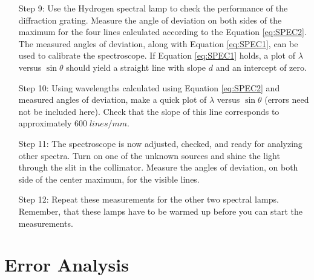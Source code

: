 \begin{itemize}[leftmargin = 50pt]
    \item[Step 9:] Use the Hydrogen spectral lamp to check the performance of the diffraction grating. Measure the angle of deviation on both sides of the maximum for the four lines calculated according to the Equation \ref{eq:SPEC2}. The measured angles of deviation, along with Equation \ref{eq:SPEC1}, can be used to calibrate the spectroscope. If Equation \ref{eq:SPEC1} holds, a plot of $\lambda$ versus $\sin\theta$ should yield a straight line with slope $d$ and an intercept of zero.
    \item[Step 10:] Using wavelengths calculated using Equation \ref{eq:SPEC2} and measured angles of deviation, make a quick plot of $\lambda$ versus $\sin\theta$ (errors need not be included here). Check that the slope of this line corresponds to approximately $600 \;lines/mm$.
    \item[Step 11:] The spectroscope is now adjusted, checked, and ready for analyzing other spectra. Turn on one of the unknown sources and shine the light through the slit in the collimator. Measure the angles of deviation, on both side of the center maximum, for the visible lines.
    \item[Step 12:] Repeat these measurements for the other two spectral lamps. Remember, that these lamps have to be warmed up before you can start the measurements.
\end{itemize}

\section{Error Analysis}

